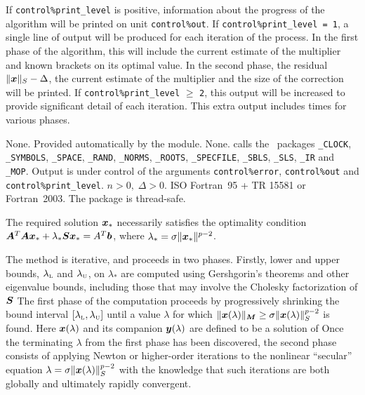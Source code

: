 \documentclass{galahad}
\newcommand{\packagename}{LLSR}
\begin{document}

\galinfo
If {\tt control\%print\_level} is positive, information about the progress
of the algorithm will be printed on unit {\tt control\-\%\-out}.
If {\tt control\%print\_level = 1}, a single line of output will be produced
for each iteration of the process. In the first phase of the algorithm,
this will include the current estimate of the multiplier and known
brackets on its optimal value. In the second phase, the residual
$\|{\bm{x}}\|_S - \Delta$, the current estimate of the multiplier and
the size of the correction will be printed.
If {\tt control\%print\_level} $\geq$ {\tt 2}, this
output will be increased to provide significant detail of each iteration.
This extra output includes times for various phases.


\galgeneral

\galcommon None.
\galworkspace Provided automatically by the module.
\galroutines None.
\galmodules {\tt \packagename\_solve} calls the \galahad\ packages
{\tt \libraryname\_CLOCK},
{\tt \libraryname\_SY\-M\-BOLS},
{\tt \libraryname\_\-SPACE},
{\tt \libraryname\-\_\-RAND},
{\tt \libraryname\_\-NORMS},
{\tt \libraryname\_\-ROOTS},
{\tt \libraryname\_SPECFILE},
{\tt \libraryname\_SBLS},
{\tt \libraryname\_SLS},
{\tt \libraryname\_IR}
and
{\tt \libraryname\_MOP}.
\galio Output is under control of the arguments
{\tt control\%error}, {\tt control\%out} and {\tt control\%print\_level}.
\galrestrictions $n  >  0, \;  \Delta  >  0$.
\galportability ISO Fortran~95 + TR 15581 or Fortran~2003.
The package is thread-safe.


\galmethod
The required solution ${\bm{x}}_*$ necessarily satisfies the optimality condition
${\bm{A}}^T {\bm{A}} {\bm{x}}_* + \lambda_* {\bm{S}} {\bm{x}}_* = A^T {\bm{b}}$,
where $\lambda_* = \sigma \|{\bm{x}}_*\|^{p-2}$.

\noindent
The method is iterative, and proceeds in two phases.
Firstly, lower and upper bounds, $\lambda_{\mbox{\protect\tiny L}}$ and
$\lambda_{\mbox{\protect\tiny U}}$, on $\lambda_*$ are computed
using Gershgorin's theorems and other eigenvalue bounds,
including those that may involve the Cholesky factorization of ${\bm{S}}$  The
first phase of the computation proceeds by progressively shrinking  the bound
interval $[\lambda_{\mbox{\protect\tiny L}},\lambda_{\mbox{\protect\tiny U}}]$
until a value $\lambda$ for which
$\|{\bm{x}}(\lambda)\|_{{\bm{M}}}  \geq  \sigma \|{\bm{x}}(\lambda)\|_S^{p-2}$ is found.
Here ${\bm{x}}(\lambda)$ and its companion ${\bm{y}}(\lambda)$
are defined to be a solution of
Once the terminating $\lambda$ from the first phase has been discovered,
the second phase
consists of applying Newton or higher-order iterations to the nonlinear
``secular'' equation $\lambda = \sigma \|{\bm{x}}(\lambda)\|_S^{p-2}$ with
the knowledge that such iterations are both globally and ultimately
rapidly convergent.
\end{document}
